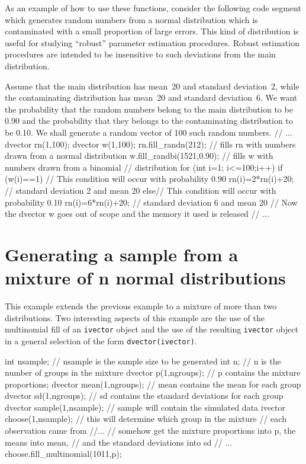 \documentclass[12pt]{book}
\begin{document}
As an example of how to use these functions, consider the following
code segment which generates random numbers from a normal distribution
which is contaminated with a small proportion of large errors.
This kind of distribution is useful for studying ``robust'' parameter 
estimation procedures. Robust estimation procedures are intended to
be insensitive to such deviations from the main distribution.

Assume that the main distribution has mean~20 and standard deviation~2,
while the contaminating distribution has mean~20 and standard 
deviation~6. We want the probability that the random numbers belong to
the main distribution to be 0.90 and the probability that they 
belongs to the contaminating distribution to be 0.10. We shall
generate a random vector of 100 such random numbers. 
\beginexample
// ...
dvector rn(1,100);
{
  dvector w(1,100);
  rn.fill_randn(212); // fills rn with numbers drawn from a normal distribution 
  w.fill_randbi(1521,0.90); // fills w with numbers drawn from a binomial
                            // distribution   
  for (int i=1; i<=100;i++)
  {
    if (w(i)==1)  // This condition will occur with probability 0.90
    {
      rn(i)=2*rn(i)+20;  // standard deviation 2 and mean 20
    }
    else// This condition will occur with probability 0.10
    {
      rn(i)=6*rn(i)+20;  // standard deviation 6 and mean 20
    }
  }
} // Now the dvector w goes out of scope and the memory it used is released
// ...
\endexample

\section{Generating a sample from a mixture of n normal distributions}
This example extends the previous example to a mixture of more than two
distributions. Two interesting aspects of this example are the use of
the multinomial fill of an {\tt ivector} object and the use of the resulting
{\tt ivector} object in a general selection of the form {\tt dvector(ivector)}.

\beginexample
int nsample;  // nsample is the sample size to be generated
int n;        // n is the number of groups in the mixture
dvector p(1,ngroups); // p contains the mixture proportions;
dvector mean(1,ngroups); // mean contains the mean for each group 
dvector sd(1,ngroups); // sd contains the standard deviations for each group 
dvector sample(1,nsample); // sample will contain the simulated data
ivector choose(1,nsample); // this will determine which group in the mixture
                           // each observation came from
//...
// somehow get the mixture proportions into p, the means into mean,
// and the standard deviations into sd
// ...
choose.fill_multinomial(1011,p); 
\end{document}
